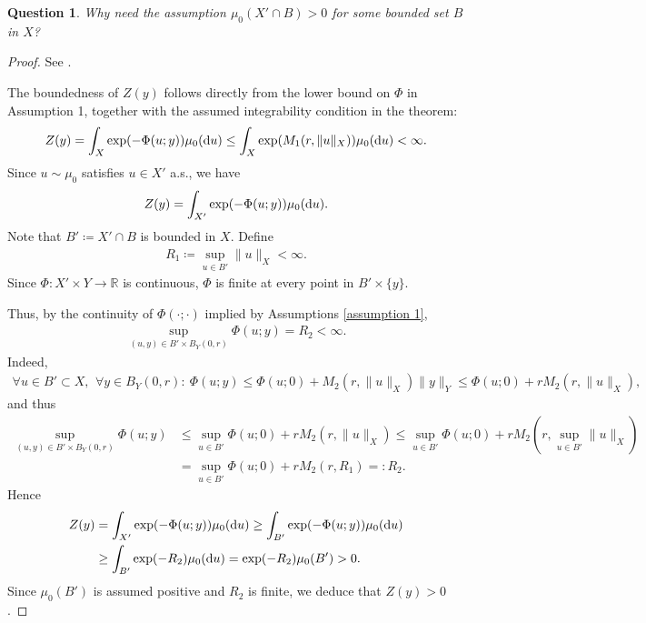 \documentclass[oneside,11pt]{book}
\numberwithin{equation}{section}
\newtheorem{question}{Question}[section]
\begin{document}
\begin{question}
    Why need the assumption $\mu_0(X'\cap B) > 0$ for some bounded set $B$ in $X$?
\end{question}

\begin{proof}
    See \cite[p. 351]{Dashti_Stuart2017}.
    
    The boundedness of $Z(y)$ follows directly from the lower bound on $\Phi$ in Assumption 1, together with the assumed integrability condition in the theorem:
    \begin{align*}
        Z(y) = \int_X \exp(-\Phi(u;y))\mu_0({\rm d}u)\le\int_X \exp(M_1(r,\|u\|_X))\mu_0({\rm d}u) < \infty.
    \end{align*}
    Since $u\sim\mu_0$ satisfies $u\in X'$ a.s., we have
    \begin{align*}
        Z(y) = \int_{X'} \exp(-\Phi(u;y))\mu_0({\rm d}u).
    \end{align*}
    Note that $B'\coloneqq X'\cap B$ is bounded in $X$. Define
    \begin{align*}
        R_1\coloneqq\sup_{u\in B'} \|u\|_X < \infty.
    \end{align*}
    Since $\Phi:X'\times Y\to\mathbb{R}$ is continuous, $\Phi$ is finite at every point in $B'\times\{y\}$.
    
    Thus, by the continuity of $\Phi(\cdot;\cdot)$ implied by Assumptions \ref{assumption 1},
    \begin{align*}
        \sup_{(u,y)\in B'\times B_Y(0,r)} \Phi(u;y) = R_2 < \infty.
    \end{align*}
    Indeed,
    \begin{align*}
        \forall u\in B'\subset X,\,\ \forall y\in B_Y(0,r):\ \Phi(u;y)\le\Phi(u;0) + M_2(r,\|u\|_X)\|y\|_Y\le\Phi(u;0) + rM_2(r,\|u\|_X),
    \end{align*}
    and thus
    \begin{align*}
        \sup_{(u,y)\in B'\times B_Y(0,r)} \Phi(u;y)&\le\sup_{u\in B'} \Phi(u;0) + rM_2(r,\|u\|_X)\le\sup_{u\in B'} \Phi(u;0) + rM_2(r,\sup_{u\in B'} \|u\|_X)\\
        &= \sup_{u\in B'} \Phi(u;0) + rM_2(r,R_1) =: R_2.
    \end{align*}
    Hence
    \begin{align}
        Z(y) &= \int_{X'} \exp(-\Phi(u;y))\mu_0({\rm d}u)\ge\int_{B'} \exp(-\Phi(u;y))\mu_0({\rm d}u)\nonumber\\
        &\ge\int_{B'} \exp(-R_2)\mu_0({\rm d}u) = \exp(-R_2)\mu_0(B') > 0.\label{Dashti_Stuart2017 (10.41)}
    \end{align}
    Since $\mu_0(B')$ is assumed positive and $R_2$ is finite, we deduce that $Z(y) > 0$.
\end{proof}
\end{document}
